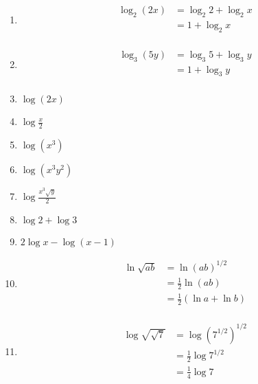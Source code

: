 \documentclass{exam}
\begin{document}
\begin{enumerate}
    \item 
      \begin{align*}
        \log_2 \left( 2x \right) &= \log_2 2 + \log_2 x \\
                                 &= \boxed{1 + \log_2 x} \\
      \end{align*}

    \item 
      \begin{align*}
        \log_3 \left( 5y \right) &= \log_3 5 + \log_3 y \\
                                 &= \boxed{1 + \log_3 y} \\
      \end{align*}

    \item $\log(2x)$

    \item $\log \frac{x}{2}$

    \item $\log(x^3)$

    \item $\log(x^3 y^2)$

    \item $\log \frac{x^3 \sqrt{y}}{2}$

    \item $\log 2 + \log 3$

    \item $2 \log x - \log (x - 1)$

      \item 
        \begin{align*}
          \ln \sqrt{ab} &= \ln (ab)^{1/2} \\
                        &= \frac{1}{2} \ln (ab) \\
                        &= \boxed{\frac{1}{2} (\ln a + \ln b)} \\
        \end{align*}

      \item
        \begin{align*}
          \log \sqrt{\sqrt{7}} &= \log \left( 7^{1/2} \right)^{1/2} \\
                               &= \frac{1}{2} \log 7^{1/2} \\
                               &= \frac{1}{4} \log 7 \\
        \end{align*}


\end{enumerate}
\end{document}
